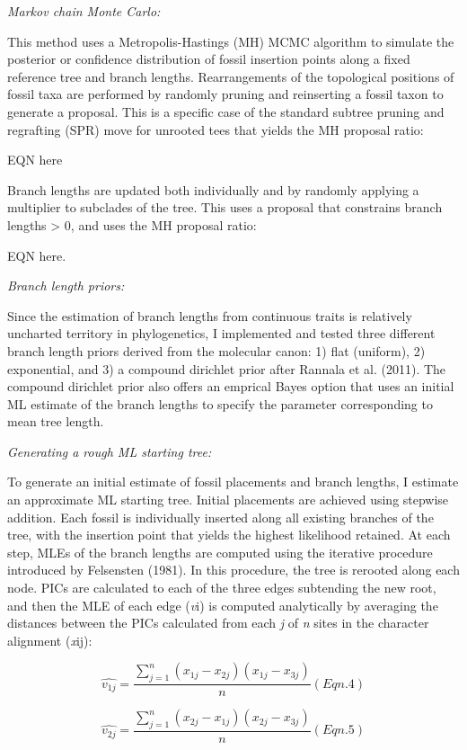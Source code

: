 \documentclass[12pt]{article}
\begin{document}
\emph{Markov chain Monte Carlo:}

This method uses a Metropolis-Hastings (MH) MCMC algorithm to simulate
the posterior or confidence distribution of fossil insertion points
along a fixed reference tree and branch lengths. Rearrangements of the
topological positions of fossil taxa are performed by randomly pruning
and reinserting a fossil taxon to generate a proposal. This is a
specific case of the standard subtree pruning and regrafting (SPR) move
for unrooted tees that yields the MH proposal ratio:

EQN here

Branch lengths are updated both individually and by randomly applying a
multiplier to subclades of the tree. This uses a proposal that
constrains branch lengths \textgreater{} 0, and uses the MH proposal
ratio:

EQN here.

\emph{Branch length priors:}

Since the estimation of branch lengths from continuous traits is
relatively uncharted territory in phylogenetics, I implemented and
tested three different branch length priors derived from the molecular
canon: 1) flat (uniform), 2) exponential, and 3) a compound dirichlet
prior after Rannala et al. (2011). The compound dirichlet prior also
offers an emprical Bayes option that uses an initial ML estimate of the
branch lengths to specify the parameter corresponding to mean tree
length.

\emph{Generating a rough ML starting tree:}

To generate an initial estimate of fossil placements and branch lengths,
I estimate an approximate ML starting tree. Initial placements are
achieved using stepwise addition. Each fossil is individually inserted
along all existing branches of the tree, with the insertion point that
yields the highest likelihood retained. At each step, MLEs of the branch
lengths are computed using the iterative procedure introduced by
Felsensten (1981). In this procedure, the tree is rerooted along each
node. PICs are calculated to each of the three edges subtending the new
root, and then the MLE of each edge (\emph{v}i) is computed analytically
by averaging the distances between the PICs calculated from each
\emph{j} of \emph{n} sites in the character alignment (\emph{x}ij):

\[ \hat{v_{1j}} =   \frac{\sum\limits_{j=1}^{n}(x_{1j}- x_{2j}) (x_{1j} - x_{3j}) }{n}(Eqn. 4)\]

\[ \hat{v_{2j}} =   \frac{\sum\limits_{j=1}^{n}(x_{2j}- x_{1j}) (x_{2j} - x_{3j})}{n} (Eqn. 5) \]
\end{document}
